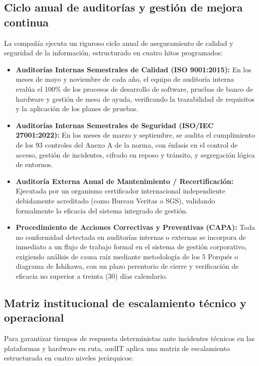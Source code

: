 \subsection{Ciclo anual de auditorías y gestión de mejora continua}\label{sec:1-auditorias}

La compañía ejecuta un riguroso ciclo anual de aseguramiento de calidad y seguridad de la información, estructurado en cuatro hitos programados:

\begin{itemize}
  \item \textbf{Auditorías Internas Semestrales de Calidad (ISO 9001:2015):} En los meses de mayo y noviembre de cada año, el equipo de auditoría interna evalúa el 100\% de los procesos de desarrollo de software, pruebas de banco de hardware y gestión de mesa de ayuda, verificando la trazabilidad de requisitos y la aplicación de los planes de pruebas.
  \item \textbf{Auditorías Internas Semestrales de Seguridad (ISO/IEC 27001:2022):} En los meses de marzo y septiembre, se audita el cumplimiento de los 93 controles del Anexo A de la norma, con énfasis en el control de acceso, gestión de incidentes, cifrado en reposo y tránsito, y segregación lógica de entornos.
  \item \textbf{Auditoría Externa Anual de Mantenimiento / Recertificación:} Ejecutada por un organismo certificador internacional independiente debidamente acreditado (como Bureau Veritas o SGS), validando formalmente la eficacia del sistema integrado de gestión.
  \item \textbf{Procedimiento de Acciones Correctivas y Preventivas (CAPA):} Toda no conformidad detectada en auditorías internas o externas se incorpora de inmediato a un flujo de trabajo formal en el sistema de gestión corporativo, exigiendo análisis de causa raíz mediante metodología de los 5 Porqués o diagrama de Ishikawa, con un plazo perentorio de cierre y verificación de eficacia no superior a treinta (30) días calendario.
\end{itemize}

\subsection{Matriz institucional de escalamiento técnico y operacional}\label{sec:1-escalamiento}

Para garantizar tiempos de respuesta deterministas ante incidentes técnicos en las plataformas y hardware en ruta, audIT aplica una matriz de escalamiento estructurada en cuatro niveles jerárquicos:

